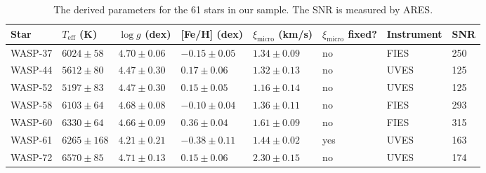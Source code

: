 \documentclass{aa}
\begin{document}
\begin{table}[htb!]
    \caption{The derived parameters for the 61 stars in our sample. The SNR
             is measured by ARES.}
    \label{tab:results}
    \centering
    \begin{tabular}{llllllll}
      \hline\hline
      Star      & $T_\mathrm{eff}$ (K) &  $\log g$ (dex)     &  [Fe/H] (dex)        &  $\xi_\mathrm{micro}$ (km/s)   & $\xi_\mathrm{micro}$ fixed? & Instrument   & SNR   \\  %
      \hline
      WASP-37     &  $6024 \pm  58$      &  $4.70 \pm 0.06$	   &  $-0.15 \pm 0.05$    &  $1.34 \pm 0.09$             &             no              & FIES         &  250  \\
      WASP-44     &  $5612 \pm  80$      &  $4.47 \pm 0.30$    &  $ 0.17 \pm 0.06$    &  $1.32 \pm 0.13$             &             no              & UVES         &  125  \\  %
      WASP-52     &  $5197 \pm  83$      &  $4.47 \pm 0.30$    &  $ 0.15 \pm 0.05$    &  $1.16 \pm 0.14$             &             no              & UVES         &  125  \\  %
      WASP-58     &  $6103 \pm  64$      &  $4.68 \pm 0.08$	   &  $-0.10 \pm 0.04$    &  $1.36 \pm 0.11$             &             no              & FIES         &  293  \\
      WASP-60     &  $6330 \pm  64$      &  $4.66 \pm 0.09$	   &  $ 0.36 \pm 0.04$    &  $1.61 \pm 0.09$             &             no              & FIES         &  315  \\
      WASP-61     &  $6265 \pm 168$      &  $4.21 \pm 0.21$    &  $-0.38 \pm 0.11$    &  $1.44 \pm 0.02$             &             yes             & UVES         &  163  \\  %
      WASP-72     &  $6570 \pm  85$      &  $4.71 \pm 0.13$    &  $ 0.15 \pm 0.06$    &  $2.30 \pm 0.15$             &             no              & UVES         &  174  \\  %

\end{tabular}
\end{table}
\end{document}
